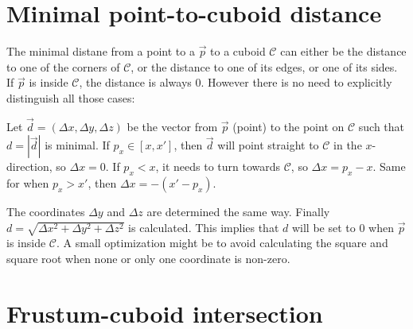 \documentclass[a4paper,10pt,abstracton,notitlepage]{scrreprt}
\begin{document}
\section{Minimal point-to-cuboid distance}
The minimal distane from a point to a $\overrightarrow{p}$ to a cuboid $\mathcal{C}$ can either be the distance to one of the corners of $\mathcal{C}$, or the distance to one of its edges, or one of its sides. If $\overrightarrow{p}$ is inside $\mathcal{C}$, the distance is always $0$. However there is no need to explicitly distinguish all those cases:

Let $\overrightarrow{d} = (\Delta x, \Delta y, \Delta z)$ be the vector from $\overrightarrow{p}$ (point) to the point on $\mathcal{C}$ such that $d = |\overrightarrow{d}|$ is minimal. If $p_{x} \in [x, x']$, then $\overrightarrow{d}$ will point straight to $\mathcal{C}$ in the $x$-direction, so $\Delta x = 0$. If $p_{x} < x$, it needs to turn towards $\mathcal{C}$, so $\Delta x = p_{x} - x$. Same for when $p_{x} > x'$, then $\Delta x = -(x' - p_{x})$.

The coordinates $\Delta y$ and $\Delta z$ are determined the same way. Finally $d = \sqrt{\Delta x^{2} + \Delta y^{2} + \Delta z^{2}}$ is calculated. This implies that $d$ will be set to $0$ when $\overrightarrow{p}$ is inside $\mathcal{C}$. A small optimization might be to avoid calculating the square and square root when none or only one coordinate is non-zero.

\section{Frustum-cuboid intersection} \label{sec:fr_cub_inter}




\end{document}
